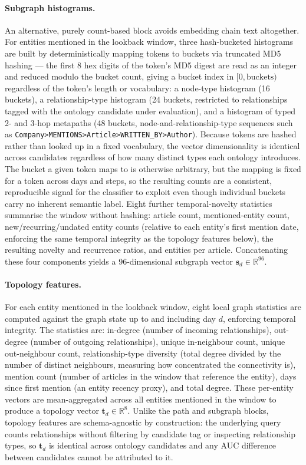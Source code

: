 \paragraph{Subgraph histograms.}
An alternative, purely count-based block avoids embedding chain text altogether.
For entities mentioned in the lookback window, three hash-bucketed histograms are built by
deterministically mapping tokens to buckets via truncated MD5 hashing --- the first 8 hex digits
of the token's MD5 digest are read as an integer and reduced modulo the bucket count, giving a
bucket index in $[0, \text{buckets})$ regardless of the token's length or vocabulary: a node-type
histogram (16 buckets), a relationship-type histogram (24 buckets, restricted to relationships
tagged with the ontology candidate under evaluation), and a histogram of typed 2- and 3-hop
metapaths (48 buckets, node-and-relationship-type sequences such as
\texttt{Company>MENTIONS>Article>WRITTEN\_BY>Author}).
Because tokens are hashed rather than looked up in a fixed vocabulary, the vector dimensionality
is identical across candidates regardless of how many distinct types each ontology introduces.
The bucket a given token maps to is otherwise arbitrary, but the mapping is fixed for a token
across days and steps, so the resulting counts are a consistent, reproducible signal for the
classifier to exploit even though individual buckets carry no inherent semantic label.
Eight further temporal-novelty statistics summarise the window without hashing: article count,
mentioned-entity count, new/recurring/undated entity counts (relative to each entity's first
mention date, enforcing the same temporal integrity as the topology features below), the
resulting novelty and recurrence ratios, and entities per article.
Concatenating these four components yields a 96-dimensional subgraph vector
$\mathbf{s}_d \in \mathbb{R}^{96}$.

\paragraph{Topology features.}
For each entity mentioned in the lookback window, eight local graph statistics are computed against
the graph state up to and including day $d$, enforcing temporal integrity.
The statistics are: in-degree (number of incoming relationships), out-degree (number of outgoing
relationships), unique in-neighbour count, unique out-neighbour count, relationship-type diversity
(total degree divided by the number of distinct neighbours, measuring how concentrated the
connectivity is), mention count (number of articles in the window that reference the entity),
days since first mention (an entity recency proxy), and total degree.
These per-entity vectors are mean-aggregated across all entities mentioned in the window to produce
a topology vector $\mathbf{t}_d \in \mathbb{R}^{8}$.
Unlike the path and subgraph blocks, topology features are schema-agnostic by construction: the
underlying query counts relationships without filtering by candidate tag or inspecting relationship
types, so $\mathbf{t}_d$ is identical across ontology candidates and any AUC difference between
candidates cannot be attributed to it.

